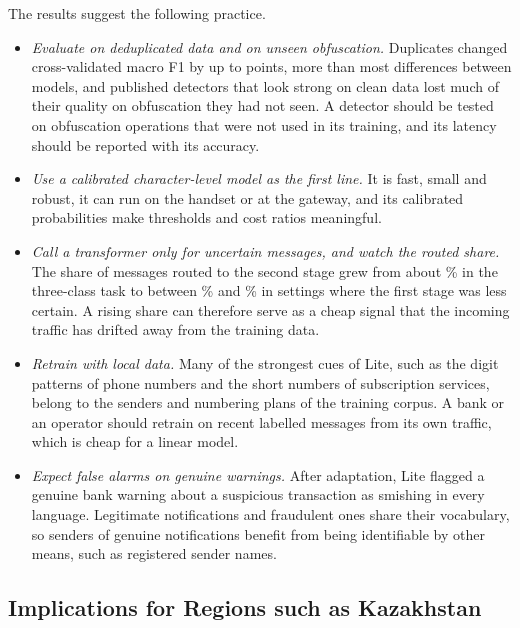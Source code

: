 The results suggest the following practice.
\begin{itemize}
\item \emph{Evaluate on deduplicated data and on unseen obfuscation.} Duplicates changed cross-validated macro F1 by up to  points, more than most differences between models, and published detectors that look strong on clean data lost much of their quality on obfuscation they had not seen. A detector should be tested on obfuscation operations that were not used in its training, and its latency should be reported with its accuracy.
\item \emph{Use a calibrated character-level model as the first line.} It is fast, small and robust, it can run on the handset or at the gateway, and its calibrated probabilities make thresholds and cost ratios meaningful.
\item \emph{Call a transformer only for uncertain messages, and watch the routed share.} The share of messages routed to the second stage grew from about \% in the three-class task to between \% and \% in settings where the first stage was less certain. A rising share can therefore serve as a cheap signal that the incoming traffic has drifted away from the training data.
\item \emph{Retrain with local data.} Many of the strongest cues of Lite, such as the digit patterns of phone numbers and the short numbers of subscription services, belong to the senders and numbering plans of the training corpus. A bank or an operator should retrain on recent labelled messages from its own traffic, which is cheap for a linear model.
\item \emph{Expect false alarms on genuine warnings.} After adaptation, Lite flagged a genuine bank warning about a suspicious transaction as smishing in every language. Legitimate notifications and fraudulent ones share their vocabulary, so senders of genuine notifications benefit from being identifiable by other means, such as registered sender names.
\end{itemize}

\subsection{Implications for Regions such as Kazakhstan}\label{sec:region}

